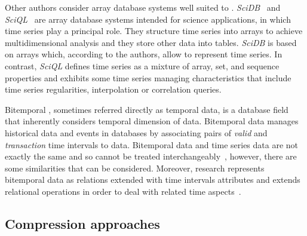 Other authors consider array database systems well suited to
.  \emph{SciDB}~\cite{stonebraker09:scidb} and
\emph{SciQL}~\cite{zhang11} are array database systems intended for
science applications, in which time series play a principal role. They
structure time series into arrays to achieve multidimensional analysis
and they store other data into tables.  \emph{SciDB} is based on
arrays which, according to the authors, allow to represent time
series.  In contrast, \emph{SciQL} defines time series as a mixture of
array, set, and sequence properties and exhibits some time series
managing characteristics that include time series regularities,
interpolation or correlation queries.


Bitemporal , sometimes referred directly as temporal data,
is a database field that inherently considers temporal dimension of
data. Bitemporal data manages historical data and events in databases
by associating pairs of \emph{valid} and \emph{transaction} time
intervals to data.  Bitemporal data and time series data are not
exactly the same and so cannot be treated
interchangeably~\cite{schmidt95}, however, there are some similarities
that can be considered. Moreover,  research represents
bitemporal data as relations extended with time intervals attributes
and extends relational operations in order to deal with related time
aspects~\cite{jensen99:temporaldata,date02:_tempor_data_relat_model}.



\subsection{Compression approaches}


